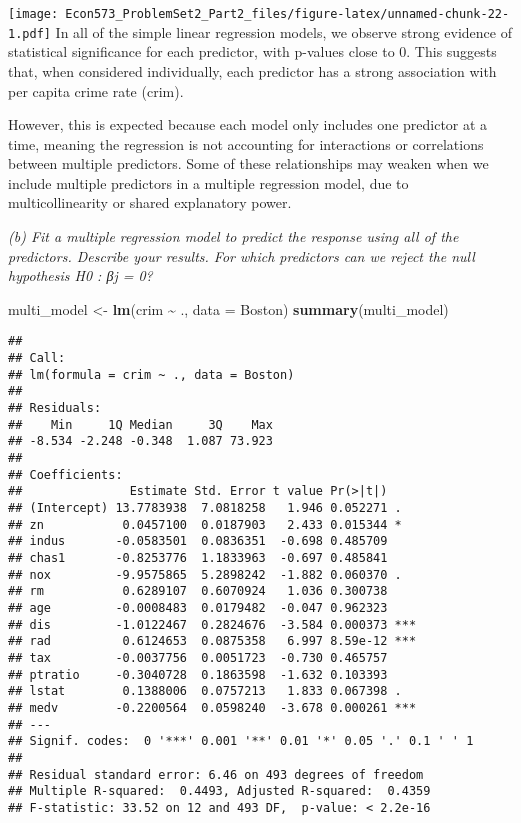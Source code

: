 \documentclass[
]{article}
\newenvironment{Shaded}{\begin{snugshade}}{\end{snugshade}}
\newcommand{\AttributeTok}[1]{\textcolor[rgb]{0.13,0.29,0.53}{#1}}
\newcommand{\FunctionTok}[1]{\textcolor[rgb]{0.13,0.29,0.53}{\textbf{#1}}}
\newcommand{\NormalTok}[1]{#1}
\newcommand{\OtherTok}[1]{\textcolor[rgb]{0.56,0.35,0.01}{#1}}
\newcommand{\SpecialCharTok}[1]{\textcolor[rgb]{0.81,0.36,0.00}{\textbf{#1}}}
\begin{document}
\texttt{[image: Econ573\_ProblemSet2\_Part2\_files/figure-latex/unnamed-chunk-22-1.pdf]}
In all of the simple linear regression models, we observe strong
evidence of statistical significance for each predictor, with p-values
close to 0. This suggests that, when considered individually, each
predictor has a strong association with per capita crime rate (crim).

However, this is expected because each model only includes one predictor
at a time, meaning the regression is not accounting for interactions or
correlations between multiple predictors. Some of these relationships
may weaken when we include multiple predictors in a multiple regression
model, due to multicollinearity or shared explanatory power.

\emph{(b) Fit a multiple regression model to predict the response using
all of the predictors. Describe your results. For which predictors can
we reject the null hypothesis H0 : βj = 0? }

\begin{Shaded}
\begin{Highlighting}[]
\NormalTok{multi\_model }\OtherTok{\textless{}{-}} \FunctionTok{lm}\NormalTok{(crim }\SpecialCharTok{\textasciitilde{}}\NormalTok{ ., }\AttributeTok{data =}\NormalTok{ Boston)}
\FunctionTok{summary}\NormalTok{(multi\_model)}
\end{Highlighting}
\end{Shaded}

\begin{verbatim}
## 
## Call:
## lm(formula = crim ~ ., data = Boston)
## 
## Residuals:
##    Min     1Q Median     3Q    Max 
## -8.534 -2.248 -0.348  1.087 73.923 
## 
## Coefficients:
##               Estimate Std. Error t value Pr(>|t|)    
## (Intercept) 13.7783938  7.0818258   1.946 0.052271 .  
## zn           0.0457100  0.0187903   2.433 0.015344 *  
## indus       -0.0583501  0.0836351  -0.698 0.485709    
## chas1       -0.8253776  1.1833963  -0.697 0.485841    
## nox         -9.9575865  5.2898242  -1.882 0.060370 .  
## rm           0.6289107  0.6070924   1.036 0.300738    
## age         -0.0008483  0.0179482  -0.047 0.962323    
## dis         -1.0122467  0.2824676  -3.584 0.000373 ***
## rad          0.6124653  0.0875358   6.997 8.59e-12 ***
## tax         -0.0037756  0.0051723  -0.730 0.465757    
## ptratio     -0.3040728  0.1863598  -1.632 0.103393    
## lstat        0.1388006  0.0757213   1.833 0.067398 .  
## medv        -0.2200564  0.0598240  -3.678 0.000261 ***
## ---
## Signif. codes:  0 '***' 0.001 '**' 0.01 '*' 0.05 '.' 0.1 ' ' 1
## 
## Residual standard error: 6.46 on 493 degrees of freedom
## Multiple R-squared:  0.4493, Adjusted R-squared:  0.4359 
## F-statistic: 33.52 on 12 and 493 DF,  p-value: < 2.2e-16
\end{verbatim}
\end{document}
